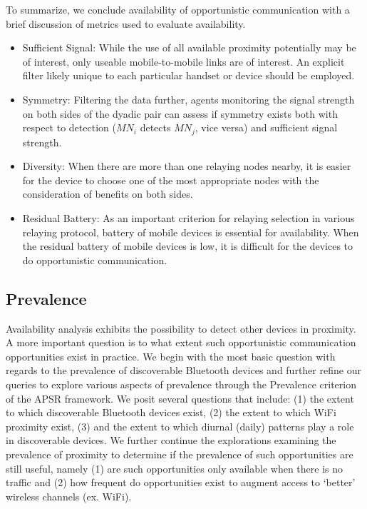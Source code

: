 To summarize, we conclude availability of opportunistic communication with a brief discussion of metrics used to evaluate availability.
\begin{itemize}
	\item Sufficient Signal: While the use of all available proximity potentially may be of interest, only useable mobile-to-mobile links are of interest.  An explicit filter likely unique to each particular handset or device should be employed.  
	\item Symmetry: Filtering the data further, agents monitoring the signal strength on both sides of the dyadic pair can assess if symmetry exists both with respect to detection ($MN_i$ detects $MN_j$, vice versa) and sufficient signal strength.  
	\item Diversity: When there are more than one relaying nodes nearby, it is easier for the device to choose one of the most appropriate nodes with the consideration of benefits on both sides. 
	\item Residual Battery: As an important criterion for relaying selection in various relaying protocol, battery of mobile devices is essential for availability. When the residual battery of mobile devices is low, it is difficult for the devices to do opportunistic communication.  
\end{itemize} 

\subsection{Prevalence}\label{sec:prevalence}
Availability analysis exhibits the possibility to detect other devices in proximity. A more important question is to what extent such opportunistic communication opportunities exist in practice.  We begin with the most basic question with regards to the prevalence of discoverable Bluetooth devices and further refine our queries to explore various aspects of prevalence through the Prevalence criterion of the APSR framework.  We posit several questions that include: (1) the extent to which discoverable Bluetooth devices exist, (2) the extent to which WiFi proximity exist, (3) and the extent to which diurnal (daily) patterns play a role in discoverable devices.  We further continue the explorations examining the prevalence of proximity to determine if the prevalence of such opportunities are still useful, namely (1) are such opportunities only available when there is no traffic and (2) how frequent do opportunities exist to augment access to `better' wireless channels (ex. WiFi).   

